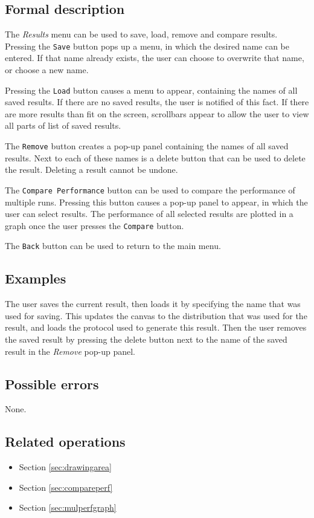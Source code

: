   \subsection*{Formal description}
  The \emph{Results} menu can be used to save, load, remove and compare results. Pressing the \texttt{Save} button pops up a menu, in which the desired name can be entered. If that name already exists, the user can choose to overwrite that name, or choose a new name.
  
  Pressing the \texttt{Load} button causes a menu to appear, containing the names of all saved results. If there are no saved results, the user is notified of this fact. If there are more results than fit on the screen, scrollbars appear to allow the user to view all parts of list of saved results.
  
  The \texttt{Remove} button creates a pop-up panel containing the names of all saved results. Next to each of these names is a delete button that can be used to delete the result. Deleting a result cannot be undone. 
  
  The \texttt{Compare Performance} button can be used to compare the performance of multiple runs. Pressing this button causes a pop-up panel to appear, in which the user can select results. The performance of all selected results are plotted in a graph once the user presses the \texttt{Compare} button.
  
  The \texttt{Back} button can be used to return to the main menu.
  
  \subsection*{Examples}
  The user saves the current result, then loads it by specifying the name that was used for saving. This updates the canvas to the distribution that was used for the result, and loads the protocol used to generate this result. Then the user removes the saved result by pressing the delete button next to the name of the saved result in the \emph{Remove} pop-up panel.

  \subsection*{Possible errors}
  None.
  
  \subsection*{Related operations}
  \begin{itemize}
    \item Section \ref{sec:drawingarea}
    \item Section \ref{sec:compareperf}
    \item Section \ref{sec:mulperfgraph}
  \end{itemize}

